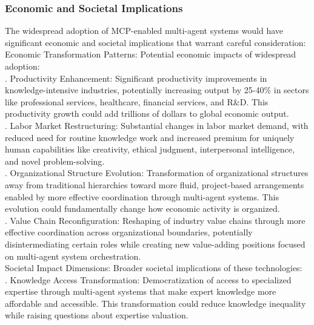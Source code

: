 \subsubsection{Economic and Societal Implications}
The widespread adoption of MCP-enabled multi-agent systems would have significant economic and societal implications that warrant careful consideration:\\ \newline
Economic Transformation Patterns: Potential economic impacts of widespread adoption:\\ . Productivity Enhancement: Significant productivity improvements in knowledge-intensive industries, potentially increasing output by 25-40\% in sectors like professional services, healthcare, financial services, and R\&D. This productivity growth could add trillions of dollars to global economic output.\\ . Labor Market Restructuring: Substantial changes in labor market demand, with reduced need for routine knowledge work and increased premium for uniquely human capabilities like creativity, ethical judgment, interpersonal intelligence, and novel problem-solving.\\ . Organizational Structure Evolution: Transformation of organizational structures away from traditional hierarchies toward more fluid, project-based arrangements enabled by more effective coordination through multi-agent systems. This evolution could fundamentally change how economic activity is organized.\\ . Value Chain Reconfiguration: Reshaping of industry value chains through more effective coordination across organizational boundaries, potentially disintermediating certain roles while creating new value-adding positions focused on multi-agent system orchestration.\\ \newline
Societal Impact Dimensions: Broader societal implications of these technologies:\\ . Knowledge Access Transformation: Democratization of access to specialized expertise through multi-agent systems that make expert knowledge more affordable and accessible. This transformation could reduce knowledge inequality while raising questions about expertise valuation.\\ \newline
